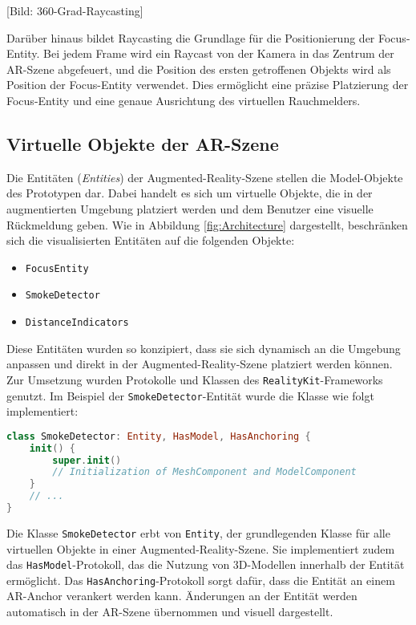 [Bild: 360-Grad-Raycasting]

Darüber hinaus bildet Raycasting die Grundlage für die Positionierung der Focus-Entity. Bei jedem Frame wird ein Raycast von der Kamera in das Zentrum der AR-Szene abgefeuert, und die Position des ersten getroffenen Objekts wird als Position der Focus-Entity verwendet. Dies ermöglicht eine präzise Platzierung der Focus-Entity und eine genaue Ausrichtung des virtuellen Rauchmelders.

\subsection{Virtuelle Objekte der AR-Szene}

Die Entitäten (\textit{Entities}) der Augmented-Reality-Szene stellen die Model-Objekte des Prototypen dar. Dabei handelt es sich um virtuelle Objekte, die in der augmentierten Umgebung platziert werden und dem Benutzer eine visuelle Rückmeldung geben. Wie in Abbildung \ref{fig:Architecture} dargestellt, beschränken sich die visualisierten Entitäten auf die folgenden Objekte:

\begin{itemize}
    \item \texttt{FocusEntity}
    \item \texttt{SmokeDetector}
    \item \texttt{DistanceIndicators}
\end{itemize}

Diese Entitäten wurden so konzipiert, dass sie sich dynamisch an die Umgebung anpassen und direkt in der Augmented-Reality-Szene platziert werden können. Zur Umsetzung wurden Protokolle und Klassen des \texttt{RealityKit}-Frameworks genutzt. Im Beispiel der \texttt{SmokeDetector}-Entität wurde die Klasse wie folgt implementiert:

\begin{lstlisting}[language=Swift]
class SmokeDetector: Entity, HasModel, HasAnchoring {
    init() {
        super.init()
        // Initialization of MeshComponent and ModelComponent
    }
    // ...
}
\end{lstlisting}

Die Klasse \texttt{SmokeDetector} erbt von \texttt{Entity}, der grundlegenden Klasse für alle virtuellen Objekte in einer Augmented-Reality-Szene. Sie implementiert zudem das \texttt{HasModel}-Protokoll, das die Nutzung von 3D-Modellen innerhalb der Entität ermöglicht. Das \texttt{HasAnchoring}-Protokoll sorgt dafür, dass die Entität an einem AR-Anchor verankert werden kann. Änderungen an der Entität werden automatisch in der AR-Szene übernommen und visuell dargestellt.

